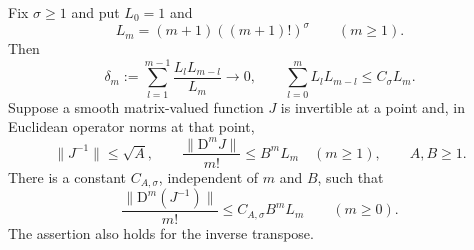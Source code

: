 \begin{lemma}
 \label{re:inverse-majorant}
Fix $\sigma\ge1$ and put $L_0=1$ and
\[
 L_m=(m+1)((m+1)!)^\sigma\qquad(m\ge1).
\]
Then
\begin{equation}
 \label{re:convolution-decay}
 \delta_m:=\sum_{l=1}^{m-1}\frac{L_lL_{m-l}}{L_m}
       \longrightarrow0,
 \qquad
 \sum_{l=0}^m L_lL_{m-l}\le C_\sigma L_m.
\end{equation}
Suppose a smooth matrix-valued function $J$ is invertible at a point
and, in Euclidean operator norms at that point,
\[
 \|J^{-1}\|\le\sqrt A,\qquad
 \frac{\|\mathrm D^mJ\|}{m!}\le B^mL_m\quad(m\ge1),
 \qquad A,B\ge1.
\]
There is a constant $C_{A,\sigma}$, independent of $m$ and $B$, such that
\begin{equation}
 \label{re:inverse-jets}
 \frac{\|\mathrm D^m(J^{-1})\|}{m!}
       \le C_{A,\sigma}B^mL_m\qquad(m\ge0).
\end{equation}
The assertion also holds for the inverse transpose.
\end{lemma}

